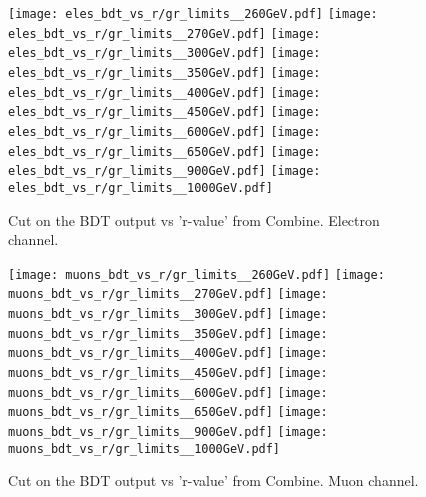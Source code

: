 \begin{figure}[!htb]%
\texttt{[image: eles\_bdt\_vs\_r/gr\_limits\_\_260GeV.pdf]}
\texttt{[image: eles\_bdt\_vs\_r/gr\_limits\_\_270GeV.pdf]}
\texttt{[image: eles\_bdt\_vs\_r/gr\_limits\_\_300GeV.pdf]}
\texttt{[image: eles\_bdt\_vs\_r/gr\_limits\_\_350GeV.pdf]}
\texttt{[image: eles\_bdt\_vs\_r/gr\_limits\_\_400GeV.pdf]}
\texttt{[image: eles\_bdt\_vs\_r/gr\_limits\_\_450GeV.pdf]}
\texttt{[image: eles\_bdt\_vs\_r/gr\_limits\_\_600GeV.pdf]}
\texttt{[image: eles\_bdt\_vs\_r/gr\_limits\_\_650GeV.pdf]}
\texttt{[image: eles\_bdt\_vs\_r/gr\_limits\_\_900GeV.pdf]}
\hspace{1.9cm}
\texttt{[image: eles\_bdt\_vs\_r/gr\_limits\_\_1000GeV.pdf]}
\caption{ Cut on the BDT output vs 'r-value' from Combine. Electron channel.}
\label{fig:ele_bdt_vs_r}                                                       
\end{figure}



\begin{figure}[!htb]%
\texttt{[image: muons\_bdt\_vs\_r/gr\_limits\_\_260GeV.pdf]}
\texttt{[image: muons\_bdt\_vs\_r/gr\_limits\_\_270GeV.pdf]}
\texttt{[image: muons\_bdt\_vs\_r/gr\_limits\_\_300GeV.pdf]}
\texttt{[image: muons\_bdt\_vs\_r/gr\_limits\_\_350GeV.pdf]}
\texttt{[image: muons\_bdt\_vs\_r/gr\_limits\_\_400GeV.pdf]}
\texttt{[image: muons\_bdt\_vs\_r/gr\_limits\_\_450GeV.pdf]}
\texttt{[image: muons\_bdt\_vs\_r/gr\_limits\_\_600GeV.pdf]}
\texttt{[image: muons\_bdt\_vs\_r/gr\_limits\_\_650GeV.pdf]}
\texttt{[image: muons\_bdt\_vs\_r/gr\_limits\_\_900GeV.pdf]}
\hspace{1.9cm}
\texttt{[image: muons\_bdt\_vs\_r/gr\_limits\_\_1000GeV.pdf]}
\caption{ Cut on the BDT output vs 'r-value' from Combine. Muon channel.}
\label{fig:muon_bdt_vs_r}           
\end{figure}

